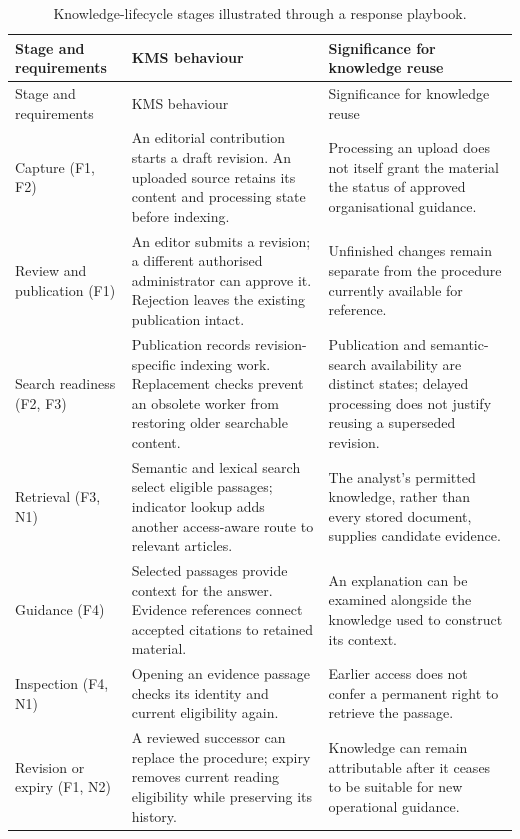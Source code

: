 \begin{longtable}{@{}>{\raggedright\arraybackslash}p{}>{\raggedright\arraybackslash}p{}>{\raggedright\arraybackslash}p{}@{}}
\caption{Knowledge-lifecycle stages illustrated through a response playbook.}\label{tab:scenario-checkpoints}\\
\toprule
Stage and requirements & KMS behaviour & Significance for knowledge reuse \\
\midrule
\endfirsthead
\toprule
Stage and requirements & KMS behaviour & Significance for knowledge reuse \\
\midrule
\endhead
Capture (F1, F2) & An editorial contribution starts a draft revision. An uploaded source retains its content and processing state before indexing. & Processing an upload does not itself grant the material the status of approved organisational guidance. \\
Review and publication (F1) & An editor submits a revision; a different authorised administrator can approve it. Rejection leaves the existing publication intact. & Unfinished changes remain separate from the procedure currently available for reference. \\
Search readiness (F2, F3) & Publication records revision-specific indexing work. Replacement checks prevent an obsolete worker from restoring older searchable content. & Publication and semantic-search availability are distinct states; delayed processing does not justify reusing a superseded revision. \\
Retrieval (F3, N1) & Semantic and lexical search select eligible passages; indicator lookup adds another access-aware route to relevant articles. & The analyst's permitted knowledge, rather than every stored document, supplies candidate evidence. \\
Guidance (F4) & Selected passages provide context for the answer. Evidence references connect accepted citations to retained material. & An explanation can be examined alongside the knowledge used to construct its context. \\
Inspection (F4, N1) & Opening an evidence passage checks its identity and current eligibility again. & Earlier access does not confer a permanent right to retrieve the passage. \\
Revision or expiry (F1, N2) & A reviewed successor can replace the procedure; expiry removes current reading eligibility while preserving its history. & Knowledge can remain attributable after it ceases to be suitable for new operational guidance. \\
\bottomrule
\end{longtable}

